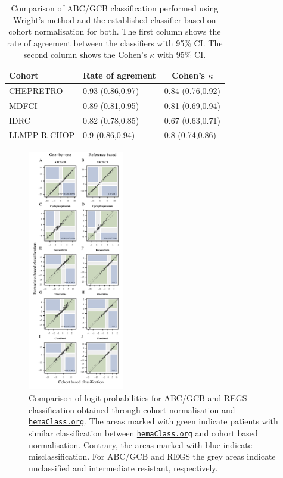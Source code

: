 \documentclass{article}
\newcommand{\hemaClass}{\href{http://hemaClass.org}{\texttt{hemaClass.org}}}
\begin{document}
\begin{table}
\small
\caption{Comparison of ABC/GCB classification performed using Wright's method and the established classifier based on cohort normalisation for both.
The first column shows the rate of agreement between the classifiers with 95\% CI.
The second column shows the Cohen's $\kappa$ with 95\% CI.\label{tab:ABCGCBclassifier}}
\begin{center}
\begin{tabular}{lll}
\hline\hline
\multicolumn{1}{l}{Cohort}&\multicolumn{1}{c}{Rate of agrement}&\multicolumn{1}{c}{Cohen's $\kappa$}\tabularnewline
\hline
CHEPRETRO&0.93 (0.86,0.97)&0.84 (0.76,0.92)\tabularnewline
MDFCI&0.89 (0.81,0.95)&0.81 (0.69,0.94)\tabularnewline
IDRC&0.82 (0.78,0.85)&0.67 (0.63,0.71)\tabularnewline
LLMPP R-CHOP&0.9 (0.86,0.94)&0.8 (0.74,0.86)\tabularnewline
\hline
\end{tabular}
\end{center}
\end{table}



%

\begin{figure}
\begin{center}
\includegraphics[width=0.375\textwidth]{DruglogitChep.pdf}
\end{center}
\caption{Comparison of logit probabilities for ABC/GCB and REGS classification obtained through cohort normalisation and \hemaClass{}.
The areas marked with green indicate patients with similar classification between \hemaClass{} and cohort based normalisation.
Contrary, the areas marked with blue indicate misclassification.
For ABC/GCB and REGS the grey areas indicate unclassified and intermediate resistant, respectively.}
\label{fig:ABCGCBDrug}
\end{figure}
\end{document}
